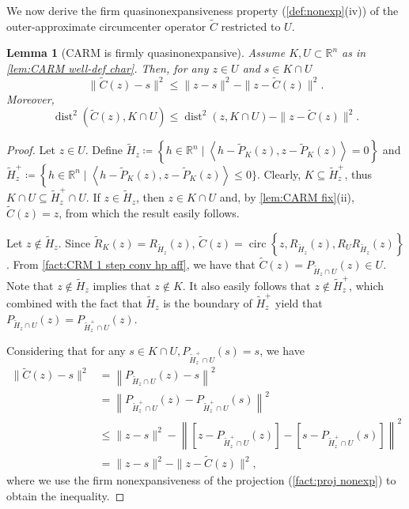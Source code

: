 \documentclass[smallextended,numbook,nospthms]{svjour3}
\theoremstyle{plain}
\newtheorem{lemma}[theorem]{Lemma}
\theoremstyle{definition}
\def\RR{\mathds R}
\DeclareMathOperator{\dist}{dist}
\newcommand{\scal}[2]{\left\langle{#1},{#2}  \right\rangle}
\DeclareMathOperator{\circum}{circ}
\begin{document}
We now derive the firm quasinonexpansiveness property (\cref{def:nonexp}(iv)) of the outer-approximate circumcenter operator $\tilde{C}$ restricted to $U$.
\begin{lemma}[CARM is firmly quasinonexpansive] \label{lem:CARM quasinonexp}
	Assume $K, U \subset \RR^{n}$ as in  \cref{lem:CARM well-def char}. Then, for any $z \in U$ and $s \in K \cap U$
	\begin{equation}\label{eq: CARM fqne}
		\|\tilde{C}(z)-s\|^{2} \leq \|z-s\|^{2}-\|z-\tilde{C}(z)\|^{2}.
		\end{equation}
	Moreover,
	\begin{equation}
		\dist^{2}(\tilde{C}(z), K \cap U) \leq \dist^{2}(z, K \cap U)-\|z-\tilde{C}(z)\|^{2}.
	\end{equation}
\end{lemma}
	\begin{proof}
	
	
	Let $z \in U$. Define $\tilde{H}_{z} \coloneqq \left\{h \in \RR^{n} \mid \scal{h-\tilde{P}_{K}(z)}{z-\tilde{P}_{K}(z)}=0\right\}$ and $\tilde{H}_{z}^{+} \coloneqq \left\{h \in \RR^{n} \mid \scal{h-\tilde{P}_{K}(z)}{z-\tilde{P}_{K}(z)}\leq\right.0\}$. Clearly, $K \subseteq \tilde{H}_{z}^{+}$, thus $K \cap U \subseteq \tilde{H}_{z}^{+} \cap U$. If $z \in \tilde{H}_{z}$, then $z \in K \cap U$ and, by  \cref{lem:CARM fix}(ii), $\tilde{C}(z)=z$, from which the result easily follows.
	
	Let $z \notin \tilde{H}_{z}$. Since $\tilde{R}_{K}(z)=R_{\tilde{H}_{z}}(z)$,  $\tilde{C}(z)=\circum\left\{z, R_{\tilde{H}_{z}}(z), R_{U}R_{\tilde{H}_{z}}(z)\right\}$. From  \cref{fact:CRM 1 step conv hp aff}, we have that $\tilde{C}(z)=P_{\tilde{H}_{z}\cap U}(z) \in U$. Note that $z \not\in \tilde{H}_{z}$ implies that $z \not\in K$. It also easily follows that $z \notin \tilde{H}_{z}^{+}$, which combined with the fact that $\tilde{H}_{z}$ is the boundary of $\tilde{H}_{z}^{+}$ yield that $P_{\tilde{H}_{z} \cap U}(z)=P_{\tilde{H}_{z}^{+} \cap U}(z)$.
	
	Considering that for any $s \in K \cap U, P_{\tilde{H}_{z}^{+} \cap U}(s)=s$, we have
	\begin{align}
	\|\tilde{C}(z)-s\|^{2}& =\left\|P_{\tilde{H}_{z} \cap U}(z)-s\right\|^{2} \\
		&=\left\|P_{\tilde{H}_{z}^{+} \cap U}(z)-P_{\tilde{H}_{z}^{+} \cap U}(s)\right\|^{2} \\
		&\leq\|z-s\|^{2}-\left\|\left[z-P_{\tilde{H}_{z}^{+} \cap U}(z)\right]-\left[s-P_{\tilde{H}_{z}^{+} \cap U}(s)\right]\right\|^{2} \\
		&=\|z-s\|^{2}-\|z-\tilde{C}(z)\|^{2},
	\end{align}
	where we use the firm nonexpansiveness of the projection (\cref{fact:proj nonexp}) to obtain the inequality.
	

\end{proof}
\end{document}
